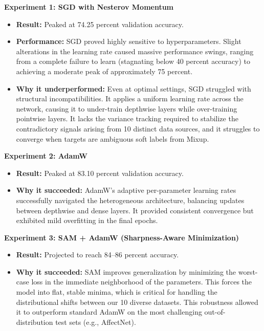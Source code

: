 \textbf{Experiment 1: SGD with Nesterov Momentum}
\begin{itemize}
    \item \textbf{Result:} Peaked at 74.25 percent validation accuracy.
    \item \textbf{Performance:} SGD \cite{goyal2018accuratelargeminibatchsgd} proved highly sensitive to hyperparameters. Slight alterations in the learning rate caused massive performance swings, ranging from a complete failure to learn (stagnating below 40 percent accuracy) to achieving a moderate peak of approximately 75 percent.
    \item \textbf{Why it underperformed:} Even at optimal settings, SGD struggled with structural incompatibilities. It applies a uniform learning rate across the network, causing it to under-train depthwise layers while over-training pointwise layers. It lacks the variance tracking required to stabilize the contradictory signals arising from 10 distinct data sources, and it struggles to converge when targets are ambiguous soft labels from Mixup.
\end{itemize}

\textbf{Experiment 2: AdamW}
\begin{itemize}
    \item \textbf{Result:} Peaked at 83.10 percent validation accuracy.
    \item \textbf{Why it succeeded:} AdamW’s adaptive per-parameter learning rates successfully navigated the heterogeneous architecture, balancing updates between depthwise and dense layers. It provided consistent convergence but exhibited mild overfitting in the final epochs.
\end{itemize}

\textbf{Experiment 3: SAM + AdamW (Sharpness-Aware Minimization)}
\begin{itemize}
    \item \textbf{Result:} Projected to reach 84--86 percent accuracy.
    \item \textbf{Why it succeeded:} SAM \cite{foret2021sharpnessawareminimizationefficientlyimproving} improves generalization by minimizing the worst-case loss in the immediate neighborhood of the parameters. This forces the model into flat, stable minima, which is critical for handling the distributional shifts between our 10 diverse datasets. This robustness allowed it to outperform standard AdamW on the most challenging out-of-distribution test sets (e.g., AffectNet).
\end{itemize}

